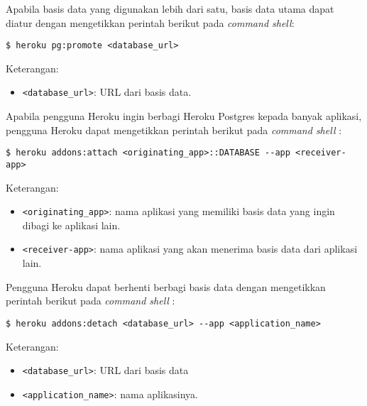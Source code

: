 Apabila basis data yang digunakan lebih dari satu, basis data utama dapat diatur dengan mengetikkan perintah berikut pada \textit{command shell}:
\begin{lstlisting}
$ heroku pg:promote <database_url>	
\end{lstlisting}
Keterangan:
\begin{itemize}
\item \texttt{<database\_url>}: URL dari basis data.
\end{itemize}

Apabila pengguna Heroku ingin berbagi Heroku Postgres kepada banyak aplikasi, pengguna Heroku dapat mengetikkan perintah berikut pada \textit{command shell} : 
\begin{lstlisting}
$ heroku addons:attach <originating_app>::DATABASE --app <receiver-app>	
\end{lstlisting}
Keterangan:
\begin{itemize}
\item \texttt{<originating\_app>}: nama aplikasi yang memiliki basis data yang ingin dibagi ke aplikasi lain. 
\item \texttt{<receiver-app>}: nama aplikasi yang akan menerima basis data dari aplikasi lain.
\end{itemize}

Pengguna Heroku dapat berhenti berbagi basis data dengan mengetikkan perintah berikut pada \textit{command shell} :
\begin{lstlisting}
$ heroku addons:detach <database_url> --app <application_name>
\end{lstlisting}
Keterangan:
\begin{itemize}
\item \texttt{<database\_url>}: URL dari basis data
\item \texttt{<application\_name>}: nama aplikasinya.
\end{itemize}

